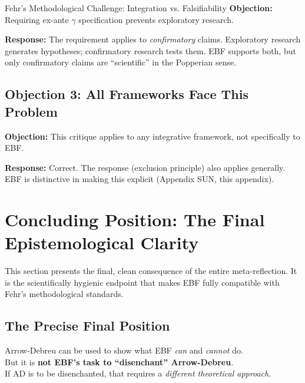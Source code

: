 \begin{chapter}{Fehr's Methodological Challenge: Integration vs. Falsifiability}
\textbf{Objection:} Requiring ex-ante $\gamma$ specification prevents exploratory research.

\textbf{Response:} The requirement applies to \textit{confirmatory} claims. Exploratory research generates hypotheses; confirmatory research tests them. EBF supports both, but only confirmatory claims are ``scientific'' in the Popperian sense.

\subsection{Objection 3: All Frameworks Face This Problem}

\textbf{Objection:} This critique applies to any integrative framework, not specifically to EBF.

\textbf{Response:} Correct. The response (exclusion principle) also applies generally. EBF is distinctive in making this explicit (Appendix SUN, this appendix).


\section{Concluding Position: The Final Epistemological Clarity}
\label{sec:conclusion}

This section presents the final, clean consequence of the entire meta-reflection.
It is the scientifically hygienic endpoint that makes EBF fully compatible with Fehr's
methodological standards.

\subsection{The Precise Final Position}

\begin{tcolorbox}[colback=blue!10!white,colframe=blue!75!black,title=\textbf{The Core Statement}]
\begin{center}
\large
Arrow-Debreu can be used to show what EBF \textit{can} and \textit{cannot} do.\\[0.5em]
But it is \textbf{not EBF's task to ``disenchant'' Arrow-Debreu}.\\[0.5em]
If AD is to be disenchanted, that requires a \textit{different theoretical approach}.
\end{center}
\end{tcolorbox}


\end{chapter}
